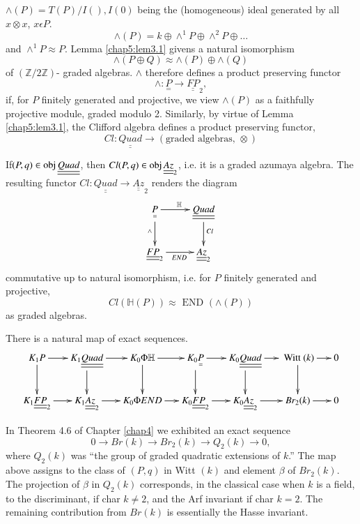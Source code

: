 $\wedge (P) = T(P) / I(), I(0)$ being the (homogeneous) ideal
generated by all $x \otimes x$, $x \epsilon P$. 
$$
\wedge (P) = k \oplus \wedge^1 P \oplus \wedge^2 P \oplus \ldots
$$
and $\wedge^1 P \approx P$. Lemma \ref{chap5:lem3.1} givens a natural
isomorphism  
$$
\wedge (P \oplus Q) \approx \wedge (P) \oplus \wedge (Q) 
$$
of $(\mathbb{Z}/2 \mathbb{Z})$- graded algebras. $\wedge$ therefore
defines a product preserving functor  
$$
\wedge : \underset{=}{P} \to \underline{\underline{FP}}_2,
$$
if, for $P$ finitely generated and projective, we view $\wedge (P)$ as
a faithfully projective module, graded modulo 2. Similarly, by virtue
of Lemma \ref{chap5:lem3.1}, the Clifford algebra defines a product preserving
functor, 
$$
Cl : \underline{\underline{Quad}} \to (\text{graded algebras, } \otimes )
$$

\setcounter{theorem}{8}
\begin{theorem}\label{chap5:thm3.9}%
If\pageoriginale $(P, q) \in \operatorname{obj} \underline{\underline{Quad}}$, then
$Cl(P, q) \in \operatorname{obj} \underline{\underline{Az}}_2$, i.e. it is a graded
azumaya algebra. The resulting functor $Cl : \underline{\underline{Quad}} \to
\underline{\underline{Az}}_2$ renders the diagram  
\[
\xymatrix{
\underset{=}{P} \ar[r]^{\mathbb{H}} \ar[d]_{\wedge} &
\underline{\underline{Quad}} \ar[d]^{Cl}\\
\underline{\underline{FP}}_2 \ar[r]_{END} & \underline{\underline{Az}}_2
}
\]
commutative up to natural isomorphism, i.e. for $P$ finitely generated
and projective, 
$$ 
Cl (\mathbb{H} (P)) \approx \text{ END } (\wedge (P))
$$
as graded algebras. 
\end{theorem}

\setcounter{coro}{9}
\begin{coro}%
There is a natural map of exact sequences.
{\fontsize{9pt}{11pt}\selectfont
\[
\xymatrix@C=.5cm{
K_1 P \ar[r] \ar[d] & K_1 \underline{\underline{Quad}} \ar[r] \ar[d] &
K_0 \Phi \mathbb{H} \ar[r] \ar[d] & K_0 \underset{=}{P} \ar[r] \ar[d]
& K_0 \underline{\underline{Quad}} \ar[r] \ar[d] & \text{ Witt } (k)
\ar[r] \ar[d] & 0\\
K_1 \underline{\underline{FP}}_2 \ar[r]& K_1 \underline{\underline{Az}}_2
\ar[r] & K_0 \Phi END \ar[r] & K_0 \underline{\underline{FP}}_2 \ar[r]&
K_0\underline{\underline{Az}}_2 \ar[r] & Br_2 (k) \ar[r] & 0
}
\]
}\relax

In Theorem 4.6 of Chapter \ref{chap4} we exhibited an exact sequence 
$$
0 \to Br(k) \to Br_2 (k) \to Q_2 (k) \to 0,
$$
where $Q_2 (k)$ was ``the group of graded quadratic extensions of 
$k$.'' The map above assigns to the class of $(P, q)$ in Witt $(k)$ and
element $\beta$ of $Br_2 (k)$. The projection of $\beta$ in $Q_2(k)$
corresponds, in the classical case when $k$ is a field, to the
discriminant, if char $k \neq 2$, and the Arf invariant if char $k
=2$. The remaining contribution from $Br(k)$ is essentially the Hasse
invariant. 
\end{coro}


